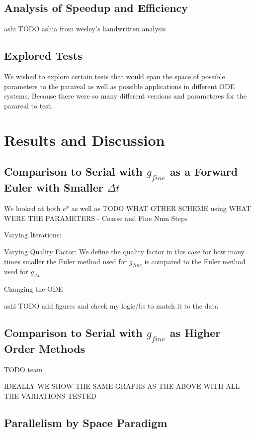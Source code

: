\documentclass[letterpaper,twocolumn,11pt]{article}
\begin{document}
\subsection{Analysis of Speedup and Efficiency}

ashi TODO ashia from wesley's handwritten analysis

\subsection{Explored Tests}

We wished to explore certain tests that would span the space of possible
parameters to the parareal as well as possible applications in different ODE
systems. Because there were so many different versions and parameteres for the parareal to test,

\section{Results and Discussion}

\subsection{Comparison to Serial with $g_{fine}$ as a Forward Euler with
Smaller $\Delta t$}

We looked at both $e^x$ as well as TODO WHAT OTHER SCHEME using WHAT WERE THE PARAMETERS - Coarse and Fine Num Steps

Varying Iterations:

Varying Quality Factor:
We define the quality factor in this case for how many times smaller the Euler method used for $g_{fine}$ is compared to the Euler method used for $g_{\Delta t}$

Changing the ODE

ashi TODO add figures and check my logic/bs to match it to the data

\subsection{Comparison to Serial with $g_{fine}$ as Higher Order Methods}

TODO team

IDEALLY WE SHOW THE SAME GRAPHS AS THE ABOVE WITH ALL THE VARIATIONS TESTED

\subsection{Parallelism by Space Paradigm}
\end{document}
